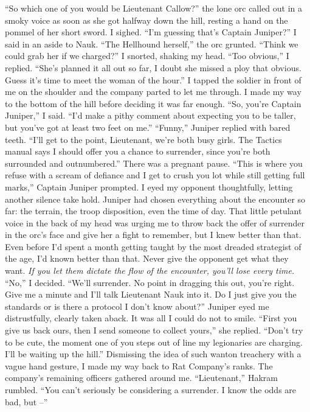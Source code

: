 \documentclass[12pt, openany]{book}
\begin{document}
“So which one of you would be Lieutenant Callow?” the lone orc called out in a smoky voice as soon as she got halfway down the hill, resting a hand on the pommel of her short sword.
I sighed.
“I’m guessing that’s Captain Juniper?” I said in an aside to Nauk.
“The Hellhound herself,” the orc grunted. “Think we could grab her if we charged?”
I snorted, shaking my head.
“Too obvious,” I replied. “She’s planned it all out so far, I doubt she missed a ploy that obvious. Guess it’s time to meet the woman of the hour.”
I tapped the soldier in front of me on the shoulder and the company parted to let me through. I made my way to the bottom of the hill before deciding it was far enough.
“So, you’re Captain Juniper,” I said. “I’d make a pithy comment about expecting you to be taller, but you’ve got at least two feet on me.”
“Funny,” Juniper replied with bared teeth. “I’ll get to the point, Lieutenant, we’re both busy girls. The Tactics manual says I should offer you a chance to surrender, since you’re both surrounded and outnumbered.”
There was a pregnant pause.
“This is where you refuse with a scream of defiance and I get to crush you lot while still getting full marks,” Captain Juniper prompted.
I eyed my opponent thoughtfully, letting another silence take hold. Juniper had chosen everything about the encounter so far: the terrain, the troop disposition, even the time of day. That little petulant voice in the back of my head was urging me to throw back the offer of surrender in the orc’s face and give her a fight to remember, but I knew better than that. Even before I’d spent a month getting taught by the most dreaded strategist of the age, I’d known better than that. Never give the opponent get what they want. \textit{If you let them dictate the flow of the encounter, you’ll lose every time.}
“No,” I decided. “We’ll surrender. No point in dragging this out, you’re right. Give me a minute and I’ll talk Lieutenant Nauk into it. Do I just give you the standards or is there a protocol I don’t know about?”
Juniper eyed me distrustfully, clearly taken aback. It was all I could do not to smile.
“First you give us back ours, then I send someone to collect yours,” she replied. “Don’t try to be cute, the moment one of you steps out of line my legionaries are charging. I’ll be waiting up the hill.”
Dismissing the idea of such wanton treachery with a vague hand gesture, I made my way back to Rat Company’s ranks. The company’s remaining officers gathered around me.
“Lieutenant,” Hakram rumbled. “You can’t seriously be considering a surrender. I know the odds are bad, but –”
\end{document}
